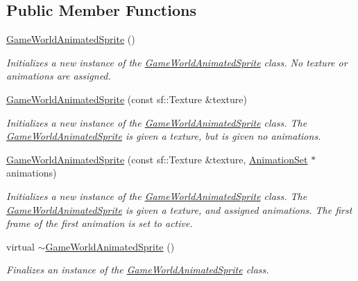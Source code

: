 \subsection*{Public Member Functions}
\begin{DoxyCompactItemize}
\item 
\hyperlink{class_game_world_animated_sprite_a3833958136cf7e0f4a0141006e48e598}{Game\+World\+Animated\+Sprite} ()
\begin{DoxyCompactList}\small\item\em Initializes a new instance of the \hyperlink{class_game_world_animated_sprite}{Game\+World\+Animated\+Sprite} class. No texture or animations are assigned. \end{DoxyCompactList}\item 
\hyperlink{class_game_world_animated_sprite_a6b80254cbd23ab70708c9a48fbc33ce7}{Game\+World\+Animated\+Sprite} (const sf\+::\+Texture \&texture)
\begin{DoxyCompactList}\small\item\em Initializes a new instance of the \hyperlink{class_game_world_animated_sprite}{Game\+World\+Animated\+Sprite} class. The \hyperlink{class_game_world_animated_sprite}{Game\+World\+Animated\+Sprite} is given a texture, but is given no animations. \end{DoxyCompactList}\item 
\hyperlink{class_game_world_animated_sprite_af8277765bcbb4eb8b5621c6141324b94}{Game\+World\+Animated\+Sprite} (const sf\+::\+Texture \&texture, \hyperlink{class_animation_set}{Animation\+Set} $\ast$animations)
\begin{DoxyCompactList}\small\item\em Initializes a new instance of the \hyperlink{class_game_world_animated_sprite}{Game\+World\+Animated\+Sprite} class. The \hyperlink{class_game_world_animated_sprite}{Game\+World\+Animated\+Sprite} is given a texture, and assigned animations. The first frame of the first animation is set to active. \end{DoxyCompactList}\item 
virtual \hyperlink{class_game_world_animated_sprite_a33868dd12e9d7496e47760a765b55d87}{$\sim$\+Game\+World\+Animated\+Sprite} ()
\begin{DoxyCompactList}\small\item\em Finalizes an instance of the \hyperlink{class_game_world_animated_sprite}{Game\+World\+Animated\+Sprite} class. \end{DoxyCompactList}\item 

\end{DoxyCompactItemize}
